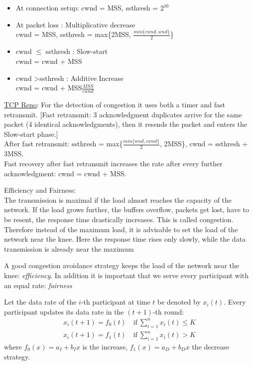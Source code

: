 \documentclass[margin=0px]{article}
\begin{document}
\begin{description}
\begin{itemize}
                  \begin{itemize}
                      \item At connection setup: cwnd = MSS, ssthresh = $2^{16}$
                      \item At packet loss : Multiplicative decrease \\
                            cwnd = MSS, ssthresh = 	max\{2MSS, $\frac{min\{cwnd, wnd\}}{2}$\}
                      \item cwnd $\leq $ ssthresh : Slow-start \\
                            cwnd = cwnd + MSS
                      \item cwnd \textgreater ssthresh : Additive Increase \\
                            cwnd = 	cwnd + MSS$\frac{MSS}{cwnd}$
                  \end{itemize}
                  \underline{TCP Reno}: For the detection of congestion it uses both a timer and fast retransmit. [Fast retransmit: 3 acknowledgment duplicates arrive for the same packet (4 identical acknowledgments), then it resends the packet and enters the Slow-start phase.] \\
                  After fast retransmit: ssthresh = max\{$\frac{min\{wnd,cwnd\}}{2}$, 2MSS\}, cwnd = ssthresh + 3MSS. \\
                  Fast recovery after fast retransmit increases the rate after every further acknowledgment: cwnd = cwnd + MSS.
        \end{itemize}

        Efficiency and Fairness: \\
        The transmission is maximal if the load almost reaches the capacity of the network. If the load grows further, the buffers overflow, packets get lost, have to be resent, the response time drastically increases. This is called congestion. Therefore instead of the maximum load, it is advisable to set the load of the network near the knee. Here the response time rises only slowly, while the data transmission is already near the maximum

        A good congestion avoidance strategy keeps the load of the network near the knee: \textit{efficiency}. In addition it is important that we serve every participant with an equal rate: \textit{fairness}

        Let the data rate of the $i$-th participant at time $t$ be denoted by $x_i(t)$.
        Every participant updates its data rate in the $(t+1)$-th round:
        \begin{align*}
            x_i(t+1) = f_0(t) \quad  \text{if} \ \sum_{i=1}^{n}x_i(t) \leq K \\
            x_i(t+1) = f_1(t) \quad  \text{if} \ \sum_{i=1}^{n}x_i(t) > K
        \end{align*}
        where $f_0(x) = a_I + b_Ix$ is the increase, $f_1(x) = a_D + b_Dx$ the decrease strategy.


\end{description}
\end{document}
